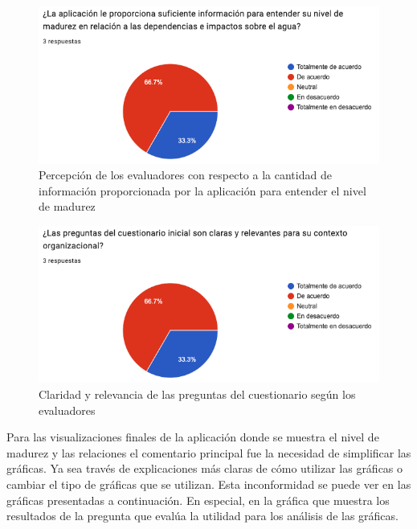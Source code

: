 \begin{figure}[H]
        \centering
        \includegraphics[scale=0.45]{images/6-validacion/7-contexto.png}
        \caption{Percepción de los evaluadores con respecto a la cantidad de información proporcionada por la aplicación para entender el nivel de madurez}
\end{figure}

\begin{figure}[H]
        \centering
        \includegraphics[scale=0.45]{images/6-validacion/8-contexto.png}
        \caption{Claridad y relevancia de las preguntas del cuestionario según los evaluadores}
\end{figure}


Para las visualizaciones finales de la aplicación donde se muestra el nivel de madurez y las relaciones el comentario principal fue la necesidad de simplificar las gráficas. Ya sea través de explicaciones más claras de cómo utilizar las gráficas o cambiar el tipo de gráficas que se utilizan. Esta inconformidad se puede ver en las gráficas presentadas a continuación. En especial, en la gráfica que muestra los resultados de la pregunta que evalúa la utilidad para los análisis de las gráficas. 


